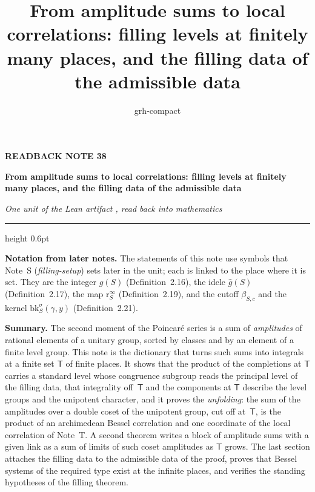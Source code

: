 \documentclass[11pt,a4paper]{article}
\title{From amplitude sums to local correlations: filling levels at finitely many places, and the filling data of the admissible data}
\author{grh-compact}
\date{}
\theoremstyle{plainx}
\theoremstyle{uprightx}
\newcommand{\sT}{\mathsf{T}}                        %
\newcommand{\gS}[1]{g(#1)}                          %
\newcommand{\gid}[1]{\hat{g}(#1)}                   %
\newcommand{\rinf}[1]{\mathrm{r}^{\infty}_{#1}}     %
\newcommand{\cutoff}[2]{\beta_{#1,#2}}              %
\newcommand{\bker}[4]{\mathrm{bk}^{#1}_{#2}(#3,#4)} %
\begin{document}
\color{ink}

{\raggedright
{\sffamily\bfseries\fontsize{7.2}{9}\selectfont\color{leancol}READBACK NOTE 38\par}
\vspace{5pt}
{\fontsize{21.5}{25.5}\selectfont\bfseries From amplitude sums to local correlations: filling levels at finitely many places, and the filling data of the admissible data\par}
\vspace{5pt}
{\fontsize{12.4}{16}\selectfont\itshape\color{inksoft} One unit of the Lean artifact \ArtifactName, read back into
mathematics\par}}
\vspace{8pt}
{\color{rulegrey}\hrule height 0.6pt}
\vspace{7pt}
\thispagestyle{empty}
\providecommand{\notelink}[3]{\href{https://nasqret.github.io/riemann-rev/writeup/browse/notes/#1.pdf\#nameddest=#2}{#3}}

\textbf{Notation from later notes.} The statements of this note use symbols that Note~S (\emph{filling-setup}) sets
later in the unit; each is linked to the place where it is set. They are the integer
\notelink{filling-setup}{theorem.2.16}{$\gS{S}$} (Definition~2.16), the idele \notelink{filling-setup}{theorem.2.17}{$\gid{S}$}
(Definition~2.17), the map \notelink{filling-setup}{theorem.2.19}{$\rinf{S}$} (Definition~2.19), and the cutoff
\notelink{filling-setup}{theorem.2.21}{$\cutoff{S}{c}$} and the kernel \notelink{filling-setup}{theorem.2.21}{$\bker{\sigma}{S}{\gamma}{y}$}
(Definition~2.21).


\textbf{Summary.} The second moment of the Poincaré series is a sum of \emph{amplitudes} of rational elements
of a unitary group, sorted by classes and by an element of a finite level group. This note is the dictionary
that turns such sums into integrals at a finite set $\sT$ of finite places. It shows that the product of the
completions at $\sT$ carries a standard level whose congruence subgroup reads the principal level of the
filling data, that integrality off~$\sT$ and the components at $\sT$ describe the level groups and the unipotent
character, and it proves the \emph{unfolding}: the sum of the amplitudes over a double coset of the unipotent
group, cut off at~$\sT$, is the product of an archimedean Bessel correlation and one coordinate of the local
correlation of Note~T. A second theorem writes a block of amplitude sums with a given link as a sum of limits
of such coset amplitudes as $\sT$ grows. The last section attaches the filling data to the admissible data of
the proof, proves that Bessel systems of the required type exist at the infinite places, and verifies the
standing hypotheses of the filling theorem.
\end{document}

